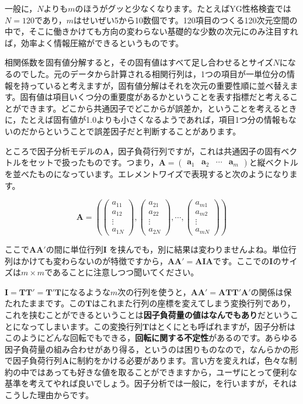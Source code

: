 \documentclass{ltjsbook}
\begin{document}
一般に，$N$よりも$m$のほうがグッと少なくなります。たとえばYG性格検査では$N=120$であり，$m$はせいぜい5から10数個です。120項目のつくる120次元空間の中で，そこに働きかけても方向の変わらない基礎的な少数の次元にのみ注目すれば，効率よく情報圧縮ができるというものです。

相関係数を固有値分解すると，その固有値はすべて足し合わせるとサイズ$N$になるのでした。元のデータから計算される相関行列は，1つの項目が一単位分の情報を持っていると考えますが，固有値分解はそれを次元の重要性順に並べ替えます。固有値は項目いくつ分の重要度があるかということを表す指標だと考えることができます。どこから共通因子でどこからが誤差か，ということを考えるときに，たとえば固有値が1.0よりも小さくなるようであれば，項目1つ分の情報もないのだからということで誤差因子だと判断することがあります。

ところで因子分析モデルの$\bm{A}$，因子負荷行列ですが，これは共通因子の固有ベクトルをセットで扱ったものです。つまり，$\bm{A} = \begin{pmatrix}\bm{a}_1 & \bm{a}_2 & \cdots& \bm{a}_m \end{pmatrix}$と縦ベクトルを並べたものになっています。エレメントワイズで表現すると次のようになります。

\[
	\bm{A} = \left (
	\begin{pmatrix}  a_{11}\\a_{12}\\\vdots\\ a_{1N} \end{pmatrix},
	\begin{pmatrix}  a_{21}\\a_{22}\\\vdots\\ a_{2N} \end{pmatrix},
	\cdots,
	\begin{pmatrix}  a_{m1}\\a_{m2}\\\vdots\\ a_{mN} \end{pmatrix}
	\right )
\]

ここで$\bm{AA'}$の間に単位行列$\bm{I}$ を挟んでも，別に結果は変わりませんよね。単位行列はかけても変わらないのが特徴ですから，$\bm{AA'}=\bm{AIA}$です。ここでの$\bm{I}$のサイズは$m \times m$であることに注意しつつ聞いてください。

$\bm{I} = \bm{TT'}=\bm{T'T}$になるような$m$次の行列を使うと，$\bm{AA'} = \bm{ATT'A'}$の関係は保たれたままです。この$\bm{T}$はこれまた行列の座標を変えてしまう変換行列であり，これを挟むことができるということは\textbf{因子負荷量の値はなんでもあり}だということになってしまいます。この変換行列$\bm{T}$はとくにとも呼ばれますが，因子分析はこのようにどんな回転でもできる，\textbf{回転に関する不定性}があるのです。あらゆる因子負荷量の組み合わせがあり得る，というのは困りものなので，なんらかの形で因子負荷行列$\bm{A}$に制約をかける必要があります。言い方を変えれば，色々な制約の中ではあっても好きな値を取ることができますから，ユーザにとって便利な基準を考えてやれば良いでしょう。因子分析では一般に，を行いますが，それはこうした理由からです。
\end{document}
